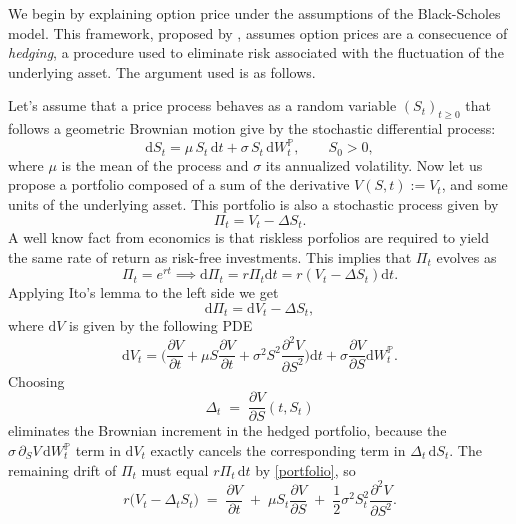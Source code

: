 \documentclass[12pt]{report} %
\theoremstyle{plain}           %
\theoremstyle{definition}      %
\theoremstyle{remark}          %
\begin{document}
We begin by explaining option price under the assumptions of the Black-Scholes model. This framework, proposed by \cite{black1973},
assumes option prices are a consecuence of \textit{hedging}, a procedure used to eliminate risk 
associated with the fluctuation of the underlying asset. The argument used is as follows.

Let's assume that a price process behaves as a random variable $(S_t)_{t\ge0}$ that follows a geometric 
Brownian motion give by the stochastic differential process:
\begin{equation}\label{eq:gbm_single_redux}
  \mathrm{d}S_t
  = \mu\,S_t\,\mathrm{d}t
  + \sigma\,S_t\,\mathrm{d}W^{\mathbb{P}}_t,
  \qquad
  S_0>0,
\end{equation}
where $\mu$ is the mean of the process and $\sigma$ its annualized volatility. Now let us propose a 
portfolio composed of a sum of the derivative $V(S, t) := V_t$, and some units of the underlying asset.
This portfolio is also a stochastic process given by
\begin{equation}
  \Pi_t = V_t- \Delta S_t.
\end{equation}
A well know fact from economics \cite{} is that riskless porfolios are required to yield the same rate of return
as risk-free investments. This implies that $\Pi_t$ evolves as
\begin{equation}\label{portfolio}
	\Pi_t = e^{rt}\implies \mathrm{d}\Pi_t = r\Pi_t\mathrm{d}t = r(V_t-\Delta S_t)\mathrm{d}t.
\end{equation}
Applying Ito's lemma to the left side we get
\begin{equation}\label{riskfree_portfolio}
	\mathrm{d}\Pi_t = \mathrm{d}V_t - \Delta S_t,
\end{equation}
where $\mathrm{d}V$ is given by the following PDE
\begin{equation}\label{ito_vadjust}
	\mathrm{d}V_t = \Big(\frac{\partial V}{\partial t}+\mu S \frac{\partial V}{\partial t} + 
	\sigma^2 S^2\frac{\partial^2 V}{\partial S^2}\Big)\mathrm{d}t + \sigma \frac{\partial V}{\partial S} \mathrm{d}W^{\mathbb{P}}_t.
\end{equation}
Choosing  
\[
\Delta_t \;=\; \frac{\partial V}{\partial S}(t,S_t)
\]
eliminates the Brownian increment in the hedged portfolio, 
because the $\sigma\,\partial_S V\,\mathrm{d}W^{\mathbb{P}}_t$ term in
$\mathrm{d}V_t$ exactly cancels the corresponding term in
$\Delta_t\,\mathrm{d}S_t$.  The remaining drift of $\Pi_t$
must equal $r\Pi_t\,\mathrm{d}t$ by \eqref{portfolio}, so
\[
r\bigl(V_t-\Delta_t S_t\bigr)
\;=\;
\frac{\partial V}{\partial t}
\;+\;
\mu S_t\frac{\partial V}{\partial S}
\;+\;
\frac{1}{2}\sigma^{2}S_t^{2}\frac{\partial^{2}V}{\partial S^{2}}.
\]
\end{document}
